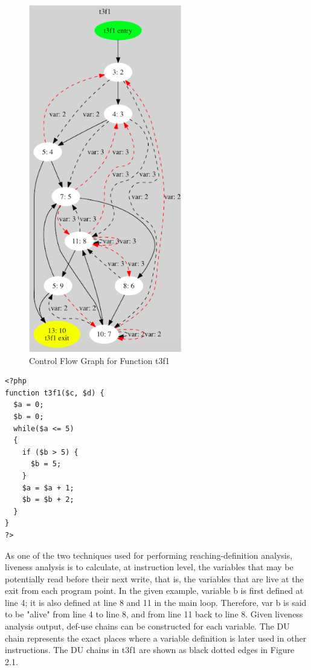 \begin{figure}
\begin{minipage}{\textwidth}
\includegraphics[width=0.6\textwidth]{figures/CFG.png}
\caption{Control Flow Graph for Function t3f1}
\label{fig:CFG}
\end{minipage}
\end{figure}

\lstset{language=PHP}
\begin{minipage}{0.5\textwidth}
\begin{lstlisting}[frame=single]
<?php
function t3f1($c, $d) {
  $a = 0;
  $b = 0;
  while($a <= 5)
  {
    if ($b > 5) {
      $b = 5;
    }
    $a = $a + 1;
    $b = $b + 2;
  }
}
?>
\end{lstlisting}
\end{minipage}
\newline

As one of the two techniques used for performing reaching-definition analysis, liveness analysis is to calculate, at instruction level, the variables that may be potentially read before their next write, that is, the variables that are live at the exit from each program point. In the given example, variable b is first defined at line 4; it is also defined at line 8 and 11 in the main loop. Therefore, var b is said to be "alive" from line 4 to line 8, and from line 11 back to line 8. Given liveness analysis output, def-use chains can be constructed for each variable. The DU chain represents the exact places where a variable definition is later used in other instructions. The DU chains in t3f1 are shown as black dotted edges in Figure 2.1.

